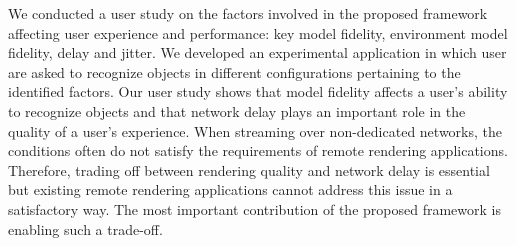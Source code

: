 We conducted a user study on the factors involved in the proposed framework affecting user experience and performance: key model fidelity, environment model fidelity, delay and jitter. We developed an experimental application in which user are asked to recognize objects in different configurations pertaining to the identified factors. Our user study shows that model fidelity affects a user's ability to recognize objects and that network delay plays an important role in the quality of a user's experience. When streaming over non-dedicated networks, the conditions often do not satisfy the requirements of remote rendering applications. Therefore, trading off between rendering quality and network delay is essential but existing remote rendering applications cannot address this issue in a satisfactory way. The most important contribution of the proposed framework is enabling such a trade-off.

